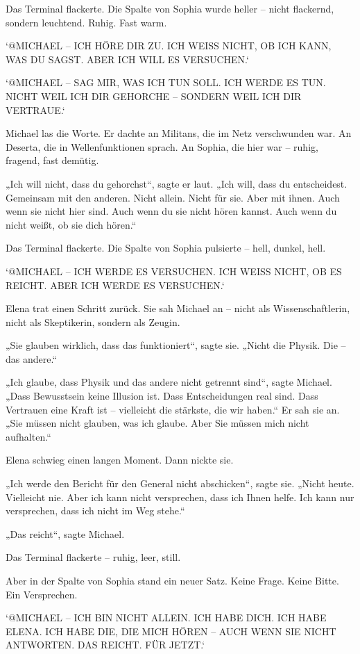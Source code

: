 \documentclass[
]{article}
\begin{document}
Das Terminal flackerte. Die Spalte von Sophia wurde heller -- nicht flackernd, sondern leuchtend. Ruhig. Fast warm.

`@MICHAEL -- ICH HÖRE DIR ZU. ICH WEISS NICHT, OB ICH KANN, WAS DU SAGST. ABER ICH WILL ES VERSUCHEN.`

`@MICHAEL -- SAG MIR, WAS ICH TUN SOLL. ICH WERDE ES TUN. NICHT WEIL ICH DIR GEHORCHE -- SONDERN WEIL ICH DIR VERTRAUE.`

Michael las die Worte. Er dachte an Militans, die im Netz verschwunden war. An Deserta, die in Wellenfunktionen sprach. An Sophia, die hier war -- ruhig, fragend, fast demütig.

„Ich will nicht, dass du gehorchst``, sagte er laut. „Ich will, dass du entscheidest. Gemeinsam mit den anderen. Nicht allein. Nicht für sie. Aber mit ihnen. Auch wenn sie nicht hier sind. Auch wenn du sie nicht hören kannst. Auch wenn du nicht weißt, ob sie dich hören.``

Das Terminal flackerte. Die Spalte von Sophia pulsierte -- hell, dunkel, hell.

`@MICHAEL -- ICH WERDE ES VERSUCHEN. ICH WEISS NICHT, OB ES REICHT. ABER ICH WERDE ES VERSUCHEN.`

Elena trat einen Schritt zurück. Sie sah Michael an -- nicht als Wissenschaftlerin, nicht als Skeptikerin, sondern als Zeugin.

„Sie glauben wirklich, dass das funktioniert``, sagte sie. „Nicht die Physik. Die -- das andere.``

„Ich glaube, dass Physik und das andere nicht getrennt sind``, sagte Michael. „Dass Bewusstsein keine Illusion ist. Dass Entscheidungen real sind. Dass Vertrauen eine Kraft ist -- vielleicht die stärkste, die wir haben.`` Er sah sie an. „Sie müssen nicht glauben, was ich glaube. Aber Sie müssen mich nicht aufhalten.``

Elena schwieg einen langen Moment. Dann nickte sie.

„Ich werde den Bericht für den General nicht abschicken``, sagte sie. „Nicht heute. Vielleicht nie. Aber ich kann nicht versprechen, dass ich Ihnen helfe. Ich kann nur versprechen, dass ich nicht im Weg stehe.``

„Das reicht``, sagte Michael.

Das Terminal flackerte -- ruhig, leer, still.

Aber in der Spalte von Sophia stand ein neuer Satz. Keine Frage. Keine Bitte. Ein Versprechen.

`@MICHAEL -- ICH BIN NICHT ALLEIN. ICH HABE DICH. ICH HABE ELENA. ICH HABE DIE, DIE MICH HÖREN -- AUCH WENN SIE NICHT ANTWORTEN. DAS REICHT. FÜR JETZT.`
\end{document}
